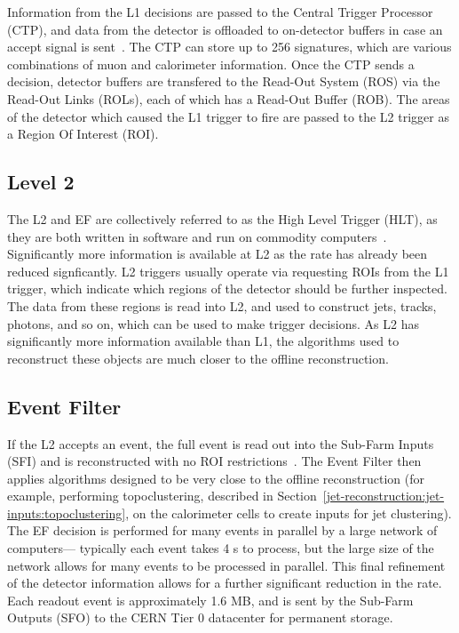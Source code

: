 Information from the L1 decisions are passed to the Central Trigger Processor (CTP), and data from the detector is offloaded to on-detector buffers in case an accept signal is sent~\cite{ATLASPaper}. The CTP can store up to 256 signatures, which are various combinations of muon and calorimeter information. Once the CTP sends a decision, detector buffers are transfered to the Read-Out System (ROS) via the Read-Out Links (ROLs), each of which has a Read-Out Buffer (ROB). The areas of the detector which caused the L1 trigger to fire are passed to the L2 trigger as a Region Of Interest (ROI).

\subsection{Level 2}

The L2 and EF are collectively referred to as the High Level Trigger (HLT), as they are both written in software and run on commodity computers~\cite{ATLASPaper}. Significantly more information is available at L2 as the rate has already been reduced signficantly. L2 triggers usually operate via requesting ROIs from the L1 trigger, which indicate which regions of the detector should be further inspected. The data from these regions is read into L2, and used to construct jets, tracks, photons, and so on, which can be used to make trigger decisions. As L2 has significantly more information available than L1, the algorithms used to reconstruct these objects are much closer to the offline reconstruction.

\subsection{Event Filter}

If the L2 accepts an event, the full event is read out into the Sub-Farm Inputs (SFI) and is reconstructed with no ROI restrictions~\cite{ATLASPaper}. The Event Filter then applies algorithms designed to be very close to the offline reconstruction (for example, performing topoclustering, described in Section~\ref{jet-reconstruction:jet-inputs:topoclustering}, on the calorimeter cells to create inputs for jet clustering). The EF decision is performed for many events in parallel by a large network of computers--- typically each event takes 4 s to process, but the large size of the network allows for many events to be processed in parallel. This final refinement of the detector information allows for a further significant reduction in the rate. Each readout event is approximately 1.6 MB, and is sent by the Sub-Farm Outputs (SFO) to the CERN Tier 0 datacenter for permanent storage.


